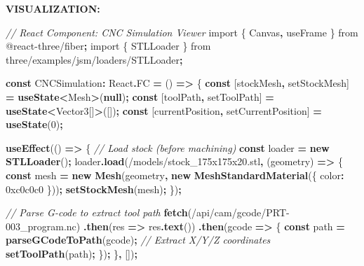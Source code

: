 \documentclass[
]{article}
\newenvironment{Shaded}{\begin{snugshade}}{\end{snugshade}}
\newcommand{\AttributeTok}[1]{\textcolor[rgb]{0.13,0.29,0.53}{#1}}
\newcommand{\BaseNTok}[1]{\textcolor[rgb]{0.00,0.00,0.81}{#1}}
\newcommand{\CommentTok}[1]{\textcolor[rgb]{0.56,0.35,0.01}{\textit{#1}}}
\newcommand{\DecValTok}[1]{\textcolor[rgb]{0.00,0.00,0.81}{#1}}
\newcommand{\FunctionTok}[1]{\textcolor[rgb]{0.13,0.29,0.53}{\textbf{#1}}}
\newcommand{\ImportTok}[1]{#1}
\newcommand{\KeywordTok}[1]{\textcolor[rgb]{0.13,0.29,0.53}{\textbf{#1}}}
\newcommand{\NormalTok}[1]{#1}
\newcommand{\OperatorTok}[1]{\textcolor[rgb]{0.81,0.36,0.00}{\textbf{#1}}}
\newcommand{\StringTok}[1]{\textcolor[rgb]{0.31,0.60,0.02}{#1}}
\begin{document}
\textbf{VISUALIZATION:}

\begin{Shaded}
\begin{Highlighting}[]
\CommentTok{// React Component: CNC Simulation Viewer}
\ImportTok{import}\NormalTok{ \{ Canvas}\OperatorTok{,}\NormalTok{ useFrame \} }\ImportTok{from} \StringTok{\textquotesingle{}@react{-}three/fiber\textquotesingle{}}\OperatorTok{;}
\ImportTok{import}\NormalTok{ \{ STLLoader \} }\ImportTok{from} \StringTok{\textquotesingle{}three/examples/jsm/loaders/STLLoader\textquotesingle{}}\OperatorTok{;}

\KeywordTok{const}\NormalTok{ CNCSimulation}\OperatorTok{:}\NormalTok{ React}\OperatorTok{.}\AttributeTok{FC} \OperatorTok{=}\NormalTok{ () }\KeywordTok{=\textgreater{}}\NormalTok{ \{}
  \KeywordTok{const}\NormalTok{ [stockMesh}\OperatorTok{,}\NormalTok{ setStockMesh] }\OperatorTok{=} \FunctionTok{useState}\OperatorTok{\textless{}}\NormalTok{Mesh}\OperatorTok{\textgreater{}}\NormalTok{(}\KeywordTok{null}\NormalTok{)}\OperatorTok{;}
  \KeywordTok{const}\NormalTok{ [toolPath}\OperatorTok{,}\NormalTok{ setToolPath] }\OperatorTok{=} \FunctionTok{useState}\OperatorTok{\textless{}}\NormalTok{Vector3[]}\OperatorTok{\textgreater{}}\NormalTok{([])}\OperatorTok{;}
  \KeywordTok{const}\NormalTok{ [currentPosition}\OperatorTok{,}\NormalTok{ setCurrentPosition] }\OperatorTok{=} \FunctionTok{useState}\NormalTok{(}\DecValTok{0}\NormalTok{)}\OperatorTok{;}

  \FunctionTok{useEffect}\NormalTok{(() }\KeywordTok{=\textgreater{}}\NormalTok{ \{}
    \CommentTok{// Load stock (before machining)}
    \KeywordTok{const}\NormalTok{ loader }\OperatorTok{=} \KeywordTok{new} \FunctionTok{STLLoader}\NormalTok{()}\OperatorTok{;}
\NormalTok{    loader}\OperatorTok{.}\FunctionTok{load}\NormalTok{(}\StringTok{\textquotesingle{}/models/stock\_175x175x20.stl\textquotesingle{}}\OperatorTok{,}\NormalTok{ (geometry) }\KeywordTok{=\textgreater{}}\NormalTok{ \{}
      \KeywordTok{const}\NormalTok{ mesh }\OperatorTok{=} \KeywordTok{new} \FunctionTok{Mesh}\NormalTok{(geometry}\OperatorTok{,} \KeywordTok{new} \FunctionTok{MeshStandardMaterial}\NormalTok{(\{ color}\OperatorTok{:} \BaseNTok{0xc0c0c0}\NormalTok{ \}))}\OperatorTok{;}
      \FunctionTok{setStockMesh}\NormalTok{(mesh)}\OperatorTok{;}
\NormalTok{    \})}\OperatorTok{;}

    \CommentTok{// Parse G{-}code to extract tool path}
    \FunctionTok{fetch}\NormalTok{(}\StringTok{\textquotesingle{}/api/cam/gcode/PRT{-}003\_program.nc\textquotesingle{}}\NormalTok{)}
      \OperatorTok{.}\FunctionTok{then}\NormalTok{(res }\KeywordTok{=\textgreater{}}\NormalTok{ res}\OperatorTok{.}\FunctionTok{text}\NormalTok{())}
      \OperatorTok{.}\FunctionTok{then}\NormalTok{(gcode }\KeywordTok{=\textgreater{}}\NormalTok{ \{}
        \KeywordTok{const}\NormalTok{ path }\OperatorTok{=} \FunctionTok{parseGCodeToPath}\NormalTok{(gcode)}\OperatorTok{;}  \CommentTok{// Extract X/Y/Z coordinates}
        \FunctionTok{setToolPath}\NormalTok{(path)}\OperatorTok{;}
\NormalTok{      \})}\OperatorTok{;}
\NormalTok{  \}}\OperatorTok{,}\NormalTok{ [])}\OperatorTok{;}


\end{Highlighting}
\end{Shaded}
\end{document}
